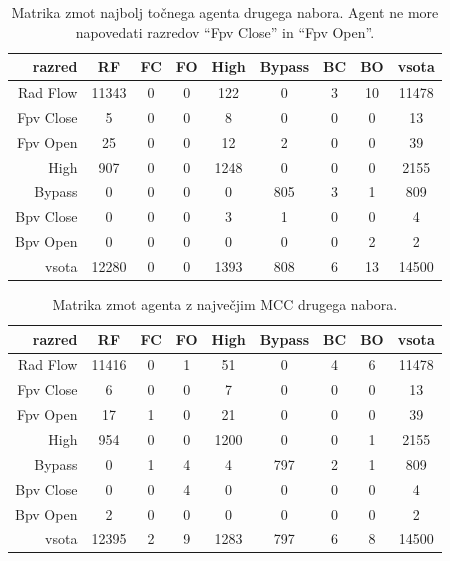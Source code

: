\begin{table}[H]
    \centering
    \begin{tabular}{||rcccccccc||}
        \hline
        razred    & RF    & FC & FO & High & Bypass & BC & BO & vsota \\ \hline
        Rad Flow  & 11343 & 0  & 0  & 122  & 0      & 3  & 10 & 11478 \\ \hline
        Fpv Close & 5     & 0  & 0  & 8    & 0      & 0  & 0  & 13    \\ \hline
        Fpv Open  & 25    & 0  & 0  & 12   & 2      & 0  & 0  & 39    \\ \hline
        High      & 907   & 0  & 0  & 1248 & 0      & 0  & 0  & 2155  \\ \hline
        Bypass    & 0     & 0  & 0  & 0    & 805    & 3  & 1  & 809   \\ \hline
        Bpv Close & 0     & 0  & 0  & 3    & 1      & 0  & 0  & 4     \\ \hline
        Bpv Open  & 0     & 0  & 0  & 0    & 0      & 0  & 2  & 2     \\ \hline
        vsota     & 12280 & 0  & 0  & 1393 & 808    & 6  & 13 & 14500 \\ \hline
    \end{tabular}
    \caption{Matrika zmot najbolj točnega agenta drugega nabora. Agent ne more napovedati razredov \enquote{Fpv Close} in \enquote{Fpv Open}.}
    \label{tab:statlog_acc_2}
\end{table}

\begin{table}[H]
    \centering
    \begin{tabular}{||rcccccccc||}
        \hline
        razred    & RF    & FC & FO & High & Bypass & BC & BO & vsota \\ \hline
        Rad Flow  & 11416 & 0  & 1  & 51   & 0      & 4  & 6  & 11478 \\ \hline
        Fpv Close & 6     & 0  & 0  & 7    & 0      & 0  & 0  & 13    \\ \hline
        Fpv Open  & 17    & 1  & 0  & 21   & 0      & 0  & 0  & 39    \\ \hline
        High      & 954   & 0  & 0  & 1200 & 0      & 0  & 1  & 2155  \\ \hline
        Bypass    & 0     & 1  & 4  & 4    & 797    & 2  & 1  & 809   \\ \hline
        Bpv Close & 0     & 0  & 4  & 0    & 0      & 0  & 0  & 4     \\ \hline
        Bpv Open  & 2     & 0  & 0  & 0    & 0      & 0  & 0  & 2     \\ \hline
        vsota     & 12395 & 2  & 9  & 1283 & 797    & 6  & 8  & 14500 \\ \hline
    \end{tabular}
    \caption{Matrika zmot agenta z največjim MCC drugega nabora.}
    \label{tab:statlog_mcc_2}
\end{table}

